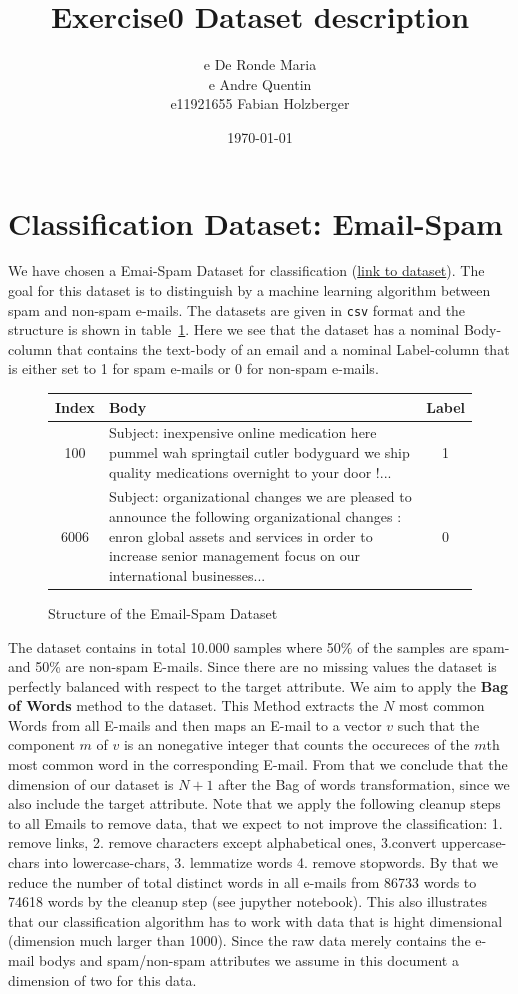 \documentclass[11pt]{article}
\title{Exercise0 Dataset description}
\author{e De Ronde Maria \\ e Andre Quentin  \\ e11921655 Fabian Holzberger }
\date{\today}
\begin{document}
\graphicspath{{./figures/}}
\maketitle

\newpage

\section{Classification Dataset: Email-Spam}
We have chosen a Emai-Spam Dataset for classification (\href{https://www.kaggle.com/nitishabharathi/email-spam-dataset?select=enronSpamSubset.csv}{link to dataset}). The goal for this dataset is to distinguish by a machine learning algorithm between  spam and non-spam e-mails. The datasets are given in \texttt{csv} format and the structure is shown in table~\ref{tab::0}. Here we see that the dataset has a nominal Body-column that contains the text-body of an email and a nominal Label-column that is either set to 1 for spam e-mails or 0 for non-spam e-mails.
%
\begin{figure}[h]
  \begin{tabular}{ | c | p{13cm} | c |}
    \hline
    Index & Body & Label \\
    \hline
    100 & 
    Subject: inexpensive online medication here
 pummel wah springtail cutler bodyguard
 we ship quality medications overnight to your door !...
    & 1 \\ \hline
    6006
    &
    Subject: organizational changes
 we are pleased to announce the following organizational changes :
 enron global assets and services
 in order to increase senior management focus on our international businesses... 
    & 0 \\
    \hline
    \end{tabular}
    \caption{Structure of the Email-Spam Dataset}
    \label{tab::0}
  \end{figure}
%
The dataset contains in total 10.000 samples where 50\% of the samples are spam- and 50\% are non-spam E-mails. Since there are no missing values the dataset is perfectly balanced with respect to the target attribute. We aim to apply the \textbf{Bag of Words} method to the dataset. This Method extracts the $N$ most common Words from all E-mails and then maps an E-mail to a vector $v$ such that the component $m$ of $v$ is an nonegative integer that counts the occureces of the $m$th most common word in the corresponding E-mail. From that we conclude that the dimension of our dataset is $N+1$ after the Bag of words transformation, since we also include the target attribute.  Note that we apply the following cleanup steps to all Emails to remove data, that we expect to not improve the classification: 1. remove links, 2. remove characters except alphabetical ones, 3.convert uppercase-chars into lowercase-chars, 3. lemmatize words 4. remove stopwords. By that we reduce the number of total distinct words in all e-mails from 86733 words to 74618 words by the cleanup step (see jupyther notebook). This also illustrates that our classification algorithm has to work with data that is hight dimensional (dimension much larger than 1000). Since the raw data merely contains the e-mail bodys and spam/non-spam attributes we assume in this document a dimension of two for this data.          
\end{document}
